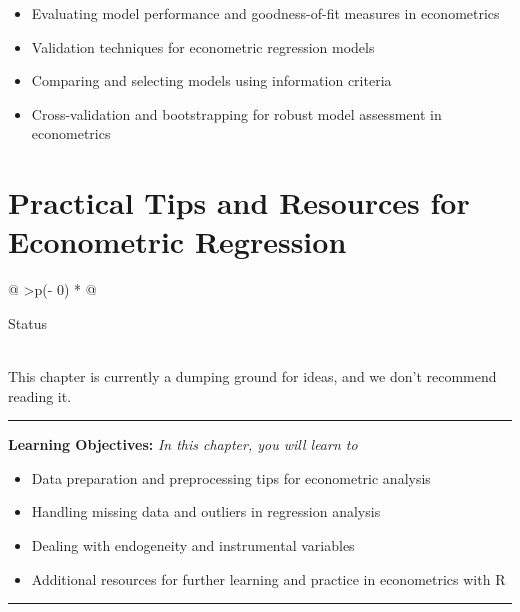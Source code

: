 \documentclass[
  letterpaper,
  twoside,
  openright,
  headsepline,
  footsepline,
  listof = totocnumbered,
  chapterprefix = true,
  titlepage = false]{scrbook}
\providecommand{\abstractname}{Learning Objectives} %
\newenvironment{objectives}[1]{%
	\hrule
	\vspace{5pt}
	\small\textbf{\abstractname: } 
	\newline
	\vspace{0.1cm}
	\small\emph{#1} %
	\itshape %
}{%
	\vspace{5pt}
	\hrule
	\vspace{0.6cm}
}
\begin{document}
\begin{itemize}
\item
  Evaluating model performance and goodness-of-fit measures in
  econometrics
\item
  Validation techniques for econometric regression models
\item
  Comparing and selecting models using information criteria
\item
  Cross-validation and bootstrapping for robust model assessment in
  econometrics
\end{itemize}


\hypertarget{practical-tips-and-resources-for-econometric-regression}{%
\chapter{Practical Tips and Resources for Econometric
Regression}\label{practical-tips-and-resources-for-econometric-regression}}

\begin{longtable}[]{@{}
  >{\centering\arraybackslash}p{(\columnwidth - 0\tabcolsep) * }@{}}
\toprule\noalign{}
\begin{minipage}[b]{\linewidth}\centering
Status
\end{minipage} \\
\midrule\noalign{}
\endhead
\bottomrule\noalign{}
\endlastfoot
This chapter is currently a dumping ground for ideas, and we don't
recommend reading it. \\
\end{longtable}

\begin{objectives}{In this chapter, you will learn to}
\begin{itemize}

\item{Data preparation and preprocessing tips for econometric analysis}

\item{Handling missing data and outliers in regression analysis}

\item{Dealing with endogeneity and instrumental variables}

\item{Additional resources for further learning and practice in econometrics with R}

\end{itemize}

\end{objectives}
\end{document}

